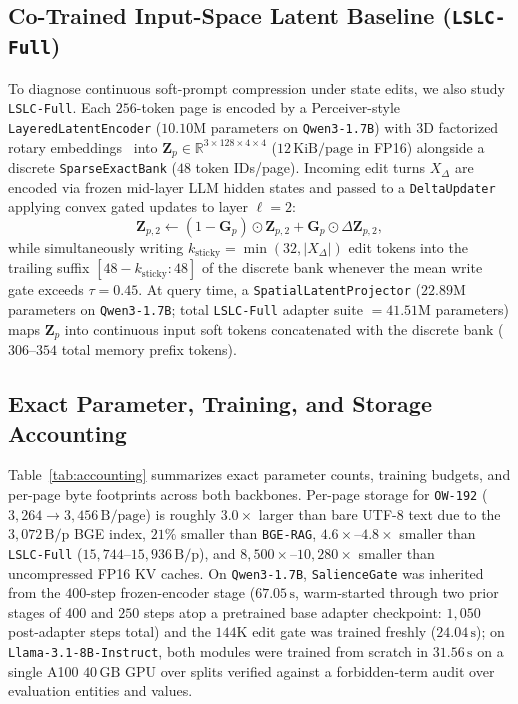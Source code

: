 \documentclass[11pt]{article}
\newcommand{\vect}[1]{\mathbf{#1}}
\renewcommand{\_}{\origunderscore\allowbreak}
\begin{document}
\subsection{Co-Trained Input-Space Latent Baseline (\texttt{LSLC-Full})}
To diagnose continuous soft-prompt compression under state edits, we also study \texttt{LSLC-Full}. Each $256$-token page is encoded by a Perceiver-style \texttt{Layered\allowbreak Latent\allowbreak Encoder} ($10.10\text{M}$ parameters on \texttt{Qwen3-1.7B}) with 3D factorized rotary embeddings~\cite{su2024roformer} into $\vect{Z}_p \in \mathbb{R}^{3 \times 128 \times 4 \times 4}$ ($12\,\text{KiB/page}$ in FP16) alongside a discrete \texttt{SparseExactBank} ($48$ token IDs/page). Incoming edit turns $X_\Delta$ are encoded via frozen mid-layer LLM hidden states and passed to a \texttt{DeltaUpdater} applying convex gated updates to layer $\ell=2$:
\begin{equation}
\vect{Z}_{p,2} \leftarrow (1 - \vect{G}_p)\odot \vect{Z}_{p,2} + \vect{G}_p \odot \Delta \vect{Z}_{p,2},
\end{equation}
while simultaneously writing $k_{\text{sticky}} = \min(32, |X_\Delta|)$ edit tokens into the trailing suffix $[48 - k_{\text{sticky}} : 48]$ of the discrete bank whenever the mean write gate exceeds $\tau = 0.45$. At query time, a \texttt{SpatialLatentProjector} ($22.89\text{M}$ parameters on \texttt{Qwen3-1.7B}; total \texttt{LSLC-Full} adapter suite $= 41.51\text{M}$ parameters) maps $\vect{Z}_p$ into continuous input soft tokens concatenated with the discrete bank ($306$--$354$ total memory prefix tokens).

\subsection{Exact Parameter, Training, and Storage Accounting}
Table~\ref{tab:accounting} summarizes exact parameter counts, training budgets, and per-page byte footprints across both backbones. Per-page storage for \texttt{OW-192} ($3{,}264 \rightarrow 3{,}456\,\text{B/page}$) is roughly $3.0\times$ larger than bare UTF-8 text due to the $3{,}072\,\text{B/p}$ BGE index, $21\%$ smaller than \texttt{BGE-RAG}, $4.6\times$--$4.8\times$ smaller than \texttt{LSLC-Full} ($15{,}744$--$15{,}936\,\text{B/p}$), and $8{,}500\times$--$10{,}280\times$ smaller than uncompressed FP16 KV caches. On \texttt{Qwen3-1.7B}, \texttt{SalienceGate} was inherited from the $400$-step frozen-encoder stage ($67.05\,\text{s}$, warm-started through two prior stages of $400$ and $250$ steps atop a pretrained base adapter checkpoint: $1{,}050$ post-adapter steps total) and the $144\text{K}$ edit gate was trained freshly ($24.04\,\text{s}$); on \texttt{Llama-3.1-8B-Instruct}, both modules were trained from scratch in $31.56\,\text{s}$ on a single A100 $40\,\text{GB}$ GPU over splits verified against a forbidden-term audit over evaluation entities and values.
\end{document}
